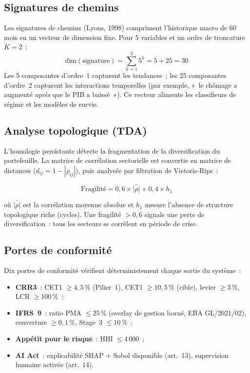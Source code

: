 \documentclass[12pt, a4paper, twoside, openright]{report}
\theoremstyle{definition}
\begin{document}
\subsection{Signatures de chemins}

Les signatures de chemins (Lyons, 1998) compriment l'historique macro de 60 mois en un vecteur de dimension fixe. Pour 5 variables et un ordre de troncature $K = 2$~:
$$\text{dim}(\text{signature}) = \sum_{k=1}^{2} 5^k = 5 + 25 = 30$$
Les 5 composantes d'ordre~1 capturent les tendances~; les 25 composantes d'ordre~2 capturent les interactions temporelles (par exemple, «~le chômage a augmenté \emph{après} que le PIB a baissé~»). Ce vecteur alimente les classifieurs de régime et les modèles de survie.

\subsection{Analyse topologique (TDA)}

L'homologie persistante détecte la fragmentation de la diversification du portefeuille. La matrice de corrélation sectorielle est convertie en matrice de distances ($d_{ij} = 1 - |\rho_{ij}|$), puis analysée par filtration de Vietoris-Rips~:

\begin{equation}
\text{Fragilité} = 0{,}6 \times \bar{|\rho|} + 0{,}4 \times h_1
\label{eq:fragility}
\end{equation}

\noindent où $\bar{|\rho|}$ est la corrélation moyenne absolue et $h_1$ mesure l'absence de structure topologique riche (cycles). Une fragilité $> 0{,}6$ signale une perte de diversification~: tous les secteurs se corrèlent en période de crise.

\subsection{Portes de conformité}

Dix portes de conformité vérifient déterministement chaque sortie du système~:
\begin{itemize}[nosep]
  \item \textbf{CRR3}~: CET1 $\geq 4{,}5\,\%$ (Pilier~1), CET1 $\geq 10{,}5\,\%$ (cible), levier $\geq 3\,\%$, LCR $\geq 100\,\%$~;
  \item \textbf{IFRS~9}~: ratio PMA $\leq 25\,\%$ (overlay de gestion borné, EBA GL/2021/02), couverture $\geq 0{,}1\,\%$, Stage~3 $\leq 10\,\%$~;
  \item \textbf{Appétit pour le risque}~: HHI $\leq 4\,000$~;
  \item \textbf{AI Act}~: explicabilité SHAP + Sobol disponible (art.~13), supervision humaine activée (art.~14).
\end{itemize}
\end{document}

